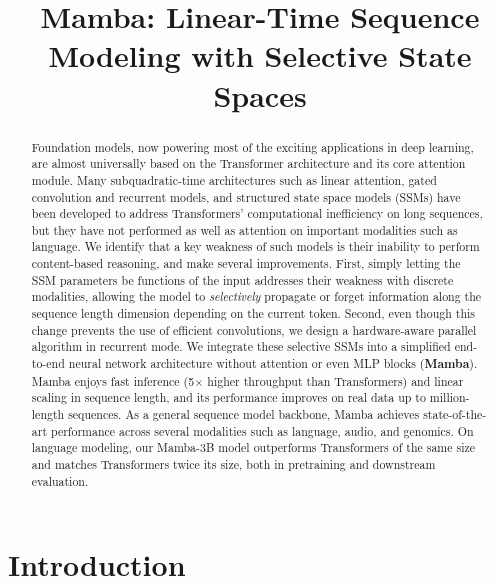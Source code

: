 \title{Mamba: Linear-Time Sequence Modeling with Selective State Spaces}

\begin{abstract}

  Foundation models, now powering most of the exciting applications in deep learning, are almost universally based on the Transformer architecture and its core attention module. Many subquadratic-time architectures such as linear attention, gated convolution and recurrent models, and structured state space models (SSMs) have been developed to address Transformers' computational inefficiency on long sequences, but they have not performed as well as attention on important modalities such as language. We identify that a key weakness of such models is their inability to perform content-based reasoning, and make several improvements. First, simply letting the SSM parameters be functions of the input addresses their weakness with discrete modalities, allowing the model to \emph{selectively} propagate or forget information along the sequence length dimension depending on the current token. Second, even though this change prevents the use of efficient convolutions, we design a hardware-aware parallel algorithm in recurrent mode. We integrate these selective SSMs into a simplified end-to-end neural network architecture without attention or even MLP blocks (\textbf{Mamba}).
  Mamba enjoys fast inference (5$\times$ higher throughput than Transformers) and linear scaling in sequence length, and its performance improves on real data up to million-length sequences. As a general sequence model backbone, Mamba achieves state-of-the-art performance across several modalities such as language, audio, and genomics. On language modeling, our Mamba-3B model outperforms Transformers of the same size and matches Transformers twice its size, both in pretraining and downstream evaluation.
\end{abstract}

\section{Introduction}
\label{sec:intro}

